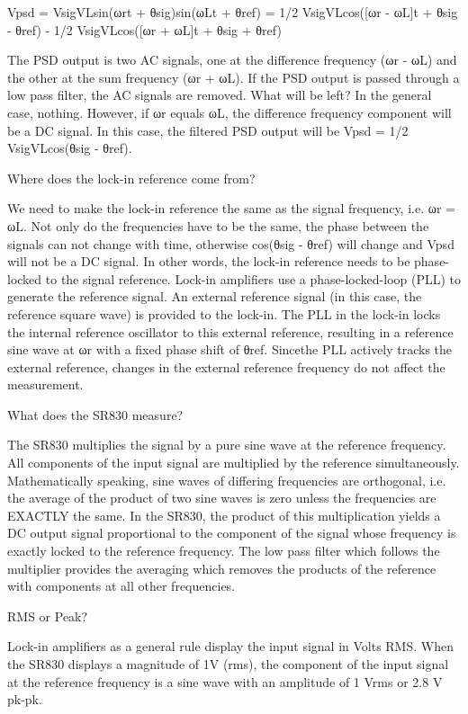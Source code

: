 \documentclass[final,5p,12pt,twocolumn]{elsaarticle}
\begin{document}
Vpsd = VsigVLsin(ωrt + θsig)sin(ωLt + θref)
= 1/2 VsigVLcos([ωr - ωL]t + θsig - θref) -
1/2 VsigVLcos([ωr + ωL]t + θsig + θref)

The PSD output is two AC signals, one at the difference frequency (ωr - ωL) and the other at the sum frequency (ωr + ωL). 
If the PSD output is passed through a low pass filter, the AC signals are removed. What will be left? In the general case, nothing. However, if ωr equals ωL, the difference frequency component will be a DC signal. In this case, the filtered PSD output will be
Vpsd = 1/2 VsigVLcos(θsig - θref).

Where does the 
lock-in reference come from?

We need to make the lock-in reference the same as the signal frequency, i.e. ωr = ωL. Not only do the frequencies have to be the same, the phase between the signals can not change with time, otherwise cos(θsig - θref) will change and Vpsd will not be a DC signal. In other words, the lock-in reference needs to be phase-locked to the signal reference. 
Lock-in amplifiers use a phase-locked-loop (PLL) to generate the reference signal. An external reference signal (in this case, the reference square wave) is provided to the lock-in. The PLL in the lock-in locks the internal reference oscillator to this external reference, resulting in a reference sine wave at ωr with a fixed phase shift of θref. Sincethe PLL actively tracks the external reference, changes in the external reference frequency do not affect the measurement.

What does the SR830 measure? 

The SR830 multiplies the signal by a pure sine wave at the reference frequency. All components of the input signal are multiplied by the reference simultaneously. Mathematically speaking, sine waves of differing frequencies are orthogonal, i.e. the average of the product of two sine waves is zero unless the frequencies are EXACTLY the same. In the SR830, the product of this multiplication yields a DC output signal proportional to the component of the signal whose frequency is exactly locked to the reference frequency. The low pass filter which follows the multiplier provides the averaging which removes the products of the reference with components at all other frequencies.

RMS or Peak?

Lock-in amplifiers as a general rule display the input signal in Volts RMS. When the SR830 displays a magnitude of 1V (rms), the component of the input signal at the reference frequency is a sine wave with an amplitude of 1 Vrms or 2.8 V pk-pk.
\end{document}
